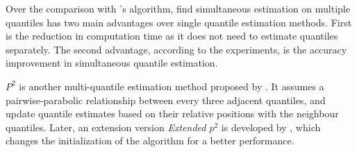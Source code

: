 Over the comparison with \citeauthor{liechtySinglepassLowstorageArbitrary}'s algorithm, \citeauthor{mcdermottDataSkeletonsSimultaneous2007}\cite{mcdermottDataSkeletonsSimultaneous2007} find simultaneous estimation on multiple quantiles has two main advantages over single quantile estimation methods. First is the reduction in computation time as it does not need to estimate quantiles separately. The second advantage, according to the experiments, is the accuracy improvement in simultaneous quantile estimation.  

\textit{$P^2$} is another multi-quantile estimation method proposed by \citeauthor{jainP2AlgorithmDynamic1985}\cite{jainP2AlgorithmDynamic1985}. It assumes a pairwise-parabolic relationship between every three adjacent quantiles, and update quantile estimates based on their relative positions with the neighbour quantiles. Later, an extension version \textit{Extended $p^2$} is developed by \citeauthor{raatikainenSequentialProcedureSimultaneous1993}\cite{raatikainenSequentialProcedureSimultaneous1993}, which changes the initialization of the algorithm for a better performance.

